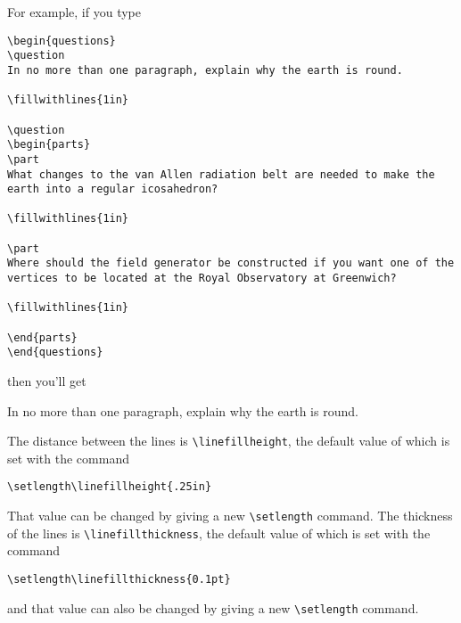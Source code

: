 \documentclass[12pt]{exam}
\begin{document}
For example, if you type
\begin{verbatim}
\begin{questions}
\question
In no more than one paragraph, explain why the earth is round.

\fillwithlines{1in}

\question
\begin{parts}
\part
What changes to the van Allen radiation belt are needed to make the
earth into a regular icosahedron?

\fillwithlines{1in}

\part
Where should the field generator be constructed if you want one of the
vertices to be located at the Royal Observatory at Greenwich?

\fillwithlines{1in}

\end{parts}
\end{questions}
\end{verbatim}
then you'll get
\begin{questions}
\question
In no more than one paragraph, explain why the earth is round.

\fillwithlines{1in}

\question
{}
\end{questions}

\medskip
The distance between the lines is \verb"\linefillheight", the default
value of which is set with the command
\begin{center}
  \verb"\setlength\linefillheight{.25in}"
\end{center}
That value can be changed by giving a new \verb"\setlength" command.
The thickness of the lines is \verb"\linefillthickness", the default
value of which is set with the command
\begin{center}
  \verb"\setlength\linefillthickness{0.1pt}"
\end{center}
and that value can also be changed by giving a new \verb"\setlength"
command.
\end{document}
